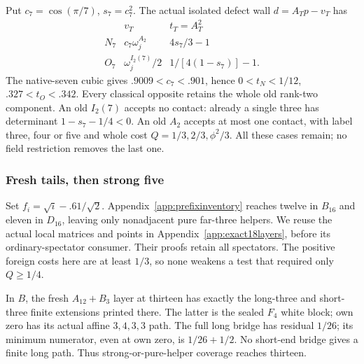 \documentclass[11pt]{article}
\theoremstyle{definition}
\theoremstyle{remark}
\begin{document}
Put \(c_7=\cos(\pi/7)\), \(s_7=c_7^2\).
The actual isolated defect wall \(d=A_Tp-v_T\) has
\[
\begin{array}{c|c|c}
&v_T&t_T=A_T^2\\\hline
N_7&c_7\omega_j^{A_2}&4s_7/3-1\\
O_7&\omega_j^{I_2(7)}/2&1/[4(1-s_7)]-1.
\end{array}
\]
The native-seven cubic gives \(.9009<c_7<.901\), hence
\(0<t_N<1/12\), \(.327<t_O<.342\).
Every classical opposite retains the whole old rank-two component.
An old \(I_2(7)\) accepts no contact: already a single three
has determinant \(1-s_7-1/4<0\). An old \(A_2\) accepts at
most one contact, with label three, four or five and whole cost
\(Q=1/3,2/3,\phi^2/3\). All these cases remain; no field
restriction removes the last one.

\subsubsection{Fresh tails, then strong five}
Set \(f_i=\sqrt i-.61/\sqrt2\). Appendix~\ref{app:prefixinventory}
reaches twelve in \(B_{16}\) and eleven in \(D_{16}\), leaving
only nonadjacent pure far-three helpers. We reuse the actual local
matrices and points in Appendix~\ref{app:exact18layers}, before
its ordinary-spectator consumer. Their proofs retain all spectators.
The positive foreign costs here are at least \(1/3\), so none
weakens a test that required only \(Q\ge1/4\).

In \(B\), the fresh \(A_{12}+B_3\) layer at thirteen has
exactly the long-three and short-three finite extensions printed
there. The latter is the sealed \(F_4\) white block; own zero
has its actual affine \(3,4,3,3\) path. The full long bridge
has residual \(1/26\); its minimum numerator, even at own zero,
is \(1/26+1/2\). No short-end bridge gives a finite long path.
Thus strong-or-pure-helper coverage reaches thirteen.
\end{document}
